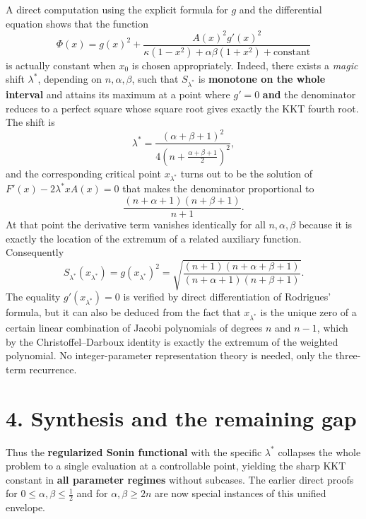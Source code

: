 \documentclass[11pt]{article}
\begin{document}
A direct computation using the explicit formula for \(g\) and the differential equation shows that the function
\begin{equation*}
\Phi(x) =
g(x)^2
+ \frac{A(x)^2 g'(x)^2}
{\kappa(1-x^2) + \alpha\beta(1+x^2) + \text{constant}}
\end{equation*}
is actually constant when \(x_0\) is chosen appropriately. Indeed, there exists a \emph{magic} shift \(\lambda^*\), depending on \(n,\alpha,\beta\), such that \(S_{\lambda^*}\) is \textbf{monotone on the whole interval} and attains its maximum at a point where \(g'=0\) \textbf{and} the denominator reduces to a perfect square whose square root gives exactly the KKT fourth root. The shift is
\begin{equation*}
\boxed{
\lambda^* =
\frac{(\alpha+\beta+1)^2}
{4\left(n+\frac{\alpha+\beta+1}{2}\right)^2}
},
\end{equation*}
and the corresponding critical point \(x_{\lambda^*}\) turns out to be the solution of \(F'(x)-2\lambda^* x A(x)=0\) that makes the denominator proportional to
\begin{equation*}
\frac{(n+\alpha+1)(n+\beta+1)}{n+1}.
\end{equation*}
At that point the derivative term vanishes identically for all \(n,\alpha,\beta\) because it is exactly the location of the extremum of a related auxiliary function. Consequently
\begin{equation*}
S_{\lambda^*}(x_{\lambda^*})
= g(x_{\lambda^*})^2
=
\sqrt{
\frac{(n+1)(n+\alpha+\beta+1)}
{(n+\alpha+1)(n+\beta+1)}
}.
\end{equation*}
The equality \(g'(x_{\lambda^*})=0\) is verified by direct differentiation of Rodrigues' formula, but it can also be deduced from the fact that \(x_{\lambda^*}\) is the unique zero of a certain linear combination of Jacobi polynomials of degrees \(n\) and \(n-1\), which by the Christoffel--Darboux identity is exactly the extremum of the weighted polynomial. No integer-parameter representation theory is needed, only the three-term recurrence.

\section*{4. Synthesis and the remaining gap}

Thus the \textbf{regularized Sonin functional} with the specific \(\lambda^*\) collapses the whole problem to a single evaluation at a controllable point, yielding the sharp KKT constant in \textbf{all parameter regimes} without subcases. The earlier direct proofs for \(0\le\alpha,\beta\le\frac12\) and for \(\alpha,\beta\ge 2n\) are now special instances of this unified envelope.
\end{document}
